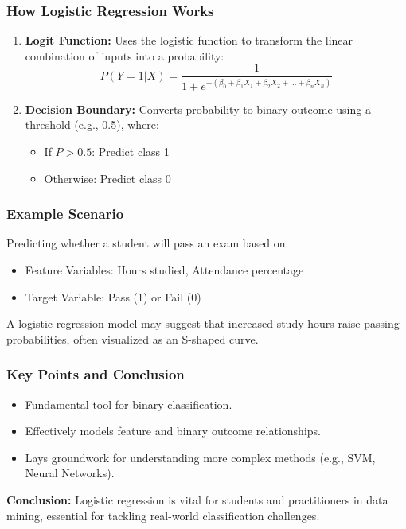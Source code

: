 \documentclass[aspectratio=169]{beamer}
\begin{document}
\begin{frame}[fragile]
    \frametitle{How Logistic Regression Works}
    \begin{enumerate}
        \item \textbf{Logit Function:} Uses the logistic function to transform the linear combination of inputs into a probability:
        \begin{equation}
            P(Y=1|X) = \frac{1}{1 + e^{-(\beta_0 + \beta_1X_1 + \beta_2X_2 + ... + \beta_nX_n)}}
        \end{equation}
        
        \item \textbf{Decision Boundary:} Converts probability to binary outcome using a threshold (e.g., 0.5), where:
        \begin{itemize}
            \item If \( P > 0.5 \): Predict class 1
            \item Otherwise: Predict class 0
        \end{itemize}
    \end{enumerate}
\end{frame}

\begin{frame}[fragile]
    \frametitle{Example Scenario}
    Predicting whether a student will pass an exam based on:
    \begin{itemize}
        \item Feature Variables: Hours studied, Attendance percentage
        \item Target Variable: Pass (1) or Fail (0)
    \end{itemize}
    
    A logistic regression model may suggest that increased study hours raise passing probabilities, often visualized as an S-shaped curve.
\end{frame}

\begin{frame}[fragile]
    \frametitle{Key Points and Conclusion}
    \begin{itemize}
        \item Fundamental tool for binary classification.
        \item Effectively models feature and binary outcome relationships.
        \item Lays groundwork for understanding more complex methods (e.g., SVM, Neural Networks).
    \end{itemize}
    
    \textbf{Conclusion:} Logistic regression is vital for students and practitioners in data mining, essential for tackling real-world classification challenges.
\end{frame}
\end{document}
